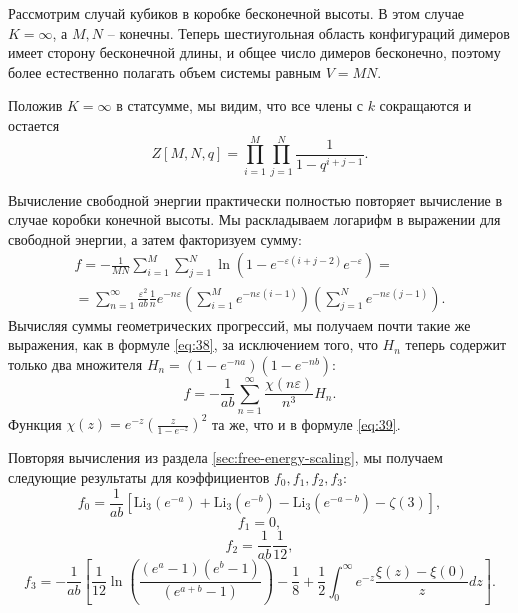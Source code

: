 \documentclass{article}
\newcommand{\Li}{\mathrm{Li}}
\begin{document}
Рассмотрим случай кубиков в коробке бесконечной высоты. В этом случае $K=\infty$, а  $M,N$ --
конечны. Теперь шестиугольная область конфигураций димеров имеет сторону бесконечной длины, и общее
число димеров бесконечно, поэтому более естественно полагать объем системы равным $V=MN$.  

Положив $K=\infty$ в статсумме, мы видим, что все члены с  $k$ сокращаются и остается 
\begin{equation}
  \label{eq:3}
  Z[M,N,q]=\prod_{i=1}^{M}\prod_{j=1}^{N}\frac{1}{1-q^{i+j-1}}.
\end{equation}

Вычисление свободной энергии практически полностью повторяет вычисление в случае коробки конечной
высоты. Мы раскладываем логарифм в выражении для свободной энергии, а затем факторизуем сумму:
\begin{multline}
  \label{eq:4}
  f=-\frac{1}{MN}\sum_{i=1}^{M}\sum_{j=1}^{N}\ln\left(1-e^{-\varepsilon(i+j-2)}e^{-\varepsilon}\right)=\\
  =\sum_{n=1}^{\infty}\frac{\varepsilon^{2}}{ab}\frac{1}{n}e^{-n\varepsilon}\left(\sum_{i=1}^{M}e^{-n\varepsilon(i-1)}\right)
  \left(\sum_{j=1}^{N}e^{-n\varepsilon(j-1)}\right).
\end{multline}
Вычисляя суммы геометрических прогрессий, мы получаем почти такие же выражения, как в формуле
\eqref{eq:38}, за исключением того, что $H_{n}$ теперь содержит только два множителя $H_{n}
=\left(1-e^{-na}\right)\left(1-e^{-nb}\right)$: 
\begin{equation}
  \label{eq:5}
  f=-\frac{1}{ab} \sum_{n=1}^{\infty}\frac{\chi(n\varepsilon)}{n^{3}} H_{n}.
\end{equation}
Функция  $\chi(z)=e^{-z}\left(\frac{z}{1-e^{-z}}\right)^{2}$ та же, что и в формуле \eqref{eq:39}. 

Повторяя вычисления из раздела  \ref{sec:free-energy-scaling}, мы получаем следующие результаты для
коэффициентов $f_{0}, f_{1}, f_{2}, f_{3}$: 
\begin{equation}
  \label{eq:6}
  f_{0}=\frac{1}{ab}\left[\Li_{3}(e^{-a})+\Li_{3}(e^{-b})-
    \Li_{3}(e^{-a-b})-\zeta(3)\right],
\end{equation}
\begin{equation}
  \label{eq:8}
  f_{1}=0,
\end{equation}
\begin{equation}
  \label{eq:9}
  f_{2}=\frac{1}{ab}\frac{1}{12},
\end{equation}
\begin{equation}
  \label{eq:11}
  f_{3}=-\frac{1}{ab}\left[\frac{1}{12}\ln\left(\frac{(e^{a}-1)(e^{b}-1)}{(e^{a+b}-1)}\right)-\frac{1}{8}+ \frac{1}{2}\int_{0}^{\infty} e^{-z}\frac{\xi(z)-\xi(0)}{z} dz
    \right].
\end{equation}
\end{document}
